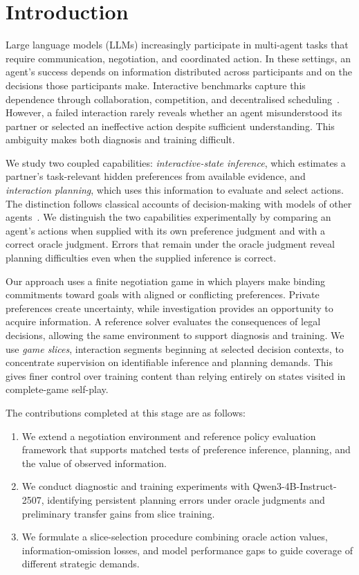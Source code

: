 \documentclass[11pt,a4paper]{article}
\begin{document}
\section{Introduction}
Large language models (LLMs) increasingly participate in multi-agent tasks
that require communication, negotiation, and coordinated action. In these
settings, an agent's success depends on information distributed across
participants and on the decisions those participants make. Interactive
benchmarks capture this dependence through collaboration, competition,
and decentralised scheduling~\cite{zhu2025multiagentbench,zou2026calbench}. However, a
failed interaction rarely reveals whether an agent misunderstood its
partner or selected an ineffective action despite sufficient understanding.
This ambiguity makes both diagnosis and training difficult.

We study two coupled capabilities: \emph{interactive-state inference},
which estimates a partner's task-relevant hidden preferences from available
evidence, and \emph{interaction planning}, which uses this information to
evaluate and select actions. The distinction follows classical accounts
of decision-making with models of other agents~\cite{gmytrasiewicz2005ipomdp,huang2024hop}.
We distinguish the two capabilities experimentally by comparing an agent's
actions when supplied with its own preference judgment and with a correct
oracle judgment. Errors that remain under the oracle judgment reveal
planning difficulties even when the supplied inference is correct.

Our approach uses a finite negotiation game in which players make binding
commitments toward goals with aligned or conflicting preferences. Private
preferences create uncertainty, while investigation provides an opportunity
to acquire information. A reference solver evaluates the consequences of
legal decisions, allowing the same environment to support diagnosis and
training. We use \emph{game slices}, interaction segments beginning at
selected decision contexts, to concentrate supervision on identifiable
inference and planning demands. This gives finer control over training
content than relying entirely on states visited in complete-game self-play.

The contributions completed at this stage are as follows:
\begin{enumerate}[topsep=4pt,itemsep=3pt]
\item We extend a negotiation environment and reference policy evaluation
framework that supports matched tests of preference inference, planning,
and the value of observed information.
\item We conduct diagnostic and training experiments with
Qwen3-4B-Instruct-2507, identifying persistent planning errors under oracle
judgments and preliminary transfer gains from slice training.
\item We formulate a slice-selection procedure combining oracle action
values, information-omission losses, and model performance gaps to guide
coverage of different strategic demands.
\end{enumerate}
\end{document}
